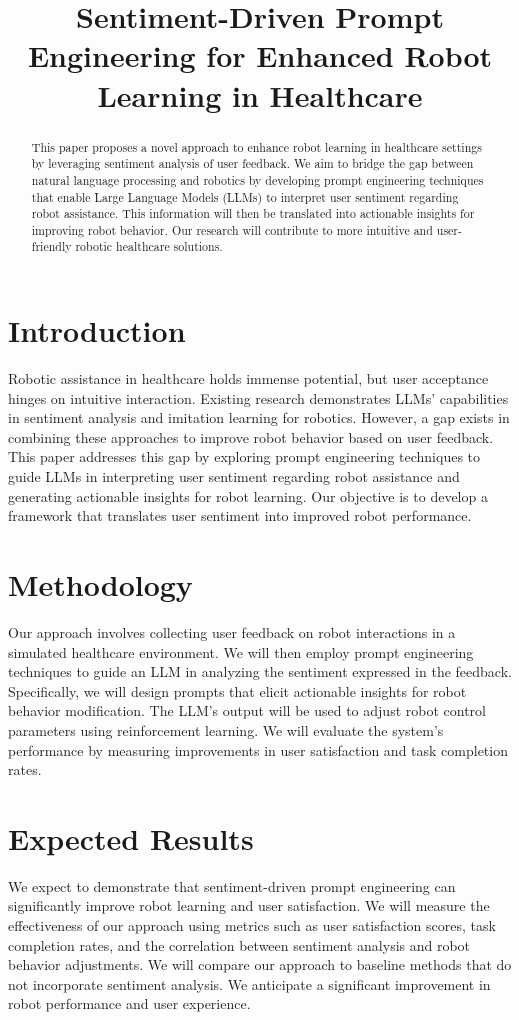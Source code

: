 \documentclass{article}
\title{Sentiment-Driven Prompt Engineering for Enhanced Robot Learning in Healthcare}
\author{}
\date{}
\begin{document}
\maketitle

\begin{abstract}
This paper proposes a novel approach to enhance robot learning in healthcare settings by leveraging sentiment analysis of user feedback. We aim to bridge the gap between natural language processing and robotics by developing prompt engineering techniques that enable Large Language Models (LLMs) to interpret user sentiment regarding robot assistance. This information will then be translated into actionable insights for improving robot behavior. Our research will contribute to more intuitive and user-friendly robotic healthcare solutions.
\end{abstract}

\section{Introduction}
Robotic assistance in healthcare holds immense potential, but user acceptance hinges on intuitive interaction. Existing research demonstrates LLMs' capabilities in sentiment analysis and imitation learning for robotics. However, a gap exists in combining these approaches to improve robot behavior based on user feedback. This paper addresses this gap by exploring prompt engineering techniques to guide LLMs in interpreting user sentiment regarding robot assistance and generating actionable insights for robot learning. Our objective is to develop a framework that translates user sentiment into improved robot performance.

\section{Methodology}
Our approach involves collecting user feedback on robot interactions in a simulated healthcare environment. We will then employ prompt engineering techniques to guide an LLM in analyzing the sentiment expressed in the feedback. Specifically, we will design prompts that elicit actionable insights for robot behavior modification. The LLM's output will be used to adjust robot control parameters using reinforcement learning. We will evaluate the system's performance by measuring improvements in user satisfaction and task completion rates.

\section{Expected Results}
We expect to demonstrate that sentiment-driven prompt engineering can significantly improve robot learning and user satisfaction. We will measure the effectiveness of our approach using metrics such as user satisfaction scores, task completion rates, and the correlation between sentiment analysis and robot behavior adjustments. We will compare our approach to baseline methods that do not incorporate sentiment analysis. We anticipate a significant improvement in robot performance and user experience.
\end{document}
